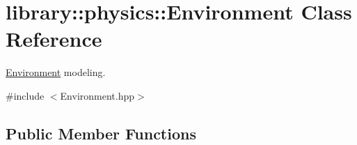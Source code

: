 \hypertarget{classlibrary_1_1physics_1_1_environment}{}\section{library\+:\+:physics\+:\+:Environment Class Reference}
\label{classlibrary_1_1physics_1_1_environment}


\hyperlink{classlibrary_1_1physics_1_1_environment}{Environment} modeling.  




{\ttfamily \#include $<$Environment.\+hpp$>$}

\subsection*{Public Member Functions}
